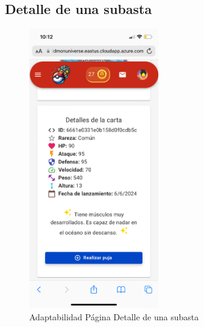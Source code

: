 \subsection*{Detalle de una subasta}
\begin{figure}[H]
    \centering
    \includegraphics[width=0.5\textwidth]{figures/adaptabilidad/detalle_subasta.png}
    \caption{Adaptabilidad Página Detalle de una subasta}
    \label{fig:Adap-Detalle-Subasta}
\end{figure}

